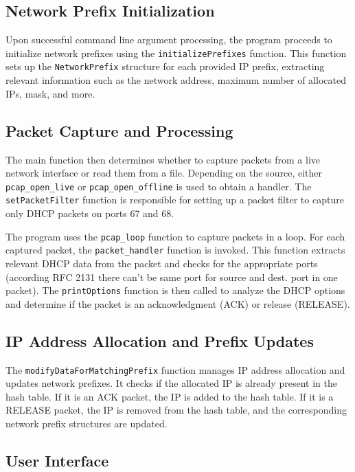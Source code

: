 \documentclass[a4paper]{article}
\begin{document}
\subsection{Network Prefix Initialization}

Upon successful command line argument processing, the program proceeds to initialize network prefixes using the \texttt{initializePrefixes} function. This function sets up the \texttt{NetworkPrefix} structure for each provided IP prefix, extracting relevant information such as the network address, maximum number of allocated IPs, mask, and more.

\subsection{Packet Capture and Processing}

The main function then determines whether to capture packets from a live network interface or read them from a file. Depending on the source, either \texttt{pcap\_open\_live} or \texttt{pcap\_open\_offline} is used to obtain a handler. The \texttt{setPacketFilter} function is responsible for setting up a packet filter to capture only DHCP packets on ports 67 and 68.

The program uses the \texttt{pcap\_loop} function to capture packets in a loop. For each captured packet, the \texttt{packet\_handler} function is invoked. This function extracts relevant DHCP data from the packet and checks for the appropriate ports (according RFC 2131 there can't be same port for source and dest. port in one packet). The \texttt{printOptions} function is then called to analyze the DHCP options and determine if the packet is an acknowledgment (ACK) or release (RELEASE).

\subsection{IP Address Allocation and Prefix Updates}

The \texttt{modifyDataForMatchingPrefix} function manages IP address allocation and updates network prefixes. It checks if the allocated IP is already present in the hash table. If it is an ACK packet, the IP is added to the hash table. If it is a RELEASE packet, the IP is removed from the hash table, and the corresponding network prefix structures are updated.

\subsection{User Interface}
\end{document}
